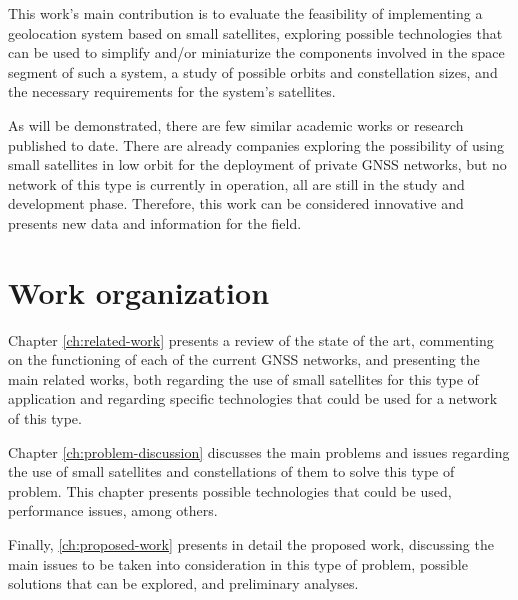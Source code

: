 This work's main contribution is to evaluate the feasibility of implementing a geolocation system based on small satellites, exploring possible technologies that can be used to simplify and/or miniaturize the components involved in the space segment of such a system, a study of possible orbits and constellation sizes, and the necessary requirements for the system's satellites.

As will be demonstrated, there are few similar academic works or research published to date. There are already companies exploring the possibility of using small satellites in low orbit for the deployment of private GNSS networks, but no network of this type is currently in operation, all are still in the study and development phase. Therefore, this work can be considered innovative and presents new data and information for the field.

\section{Work organization}




Chapter \ref{ch:related-work} presents a review of the state of the art, commenting on the functioning of each of the current GNSS networks, and presenting the main related works, both regarding the use of small satellites for this type of application and regarding specific technologies that could be used for a network of this type.

Chapter \ref{ch:problem-discussion} discusses the main problems and issues regarding the use of small satellites and constellations of them to solve this type of problem. This chapter presents possible technologies that could be used, performance issues, among others.

Finally, \autoref{ch:proposed-work} presents in detail the proposed work, discussing the main issues to be taken into consideration in this type of problem, possible solutions that can be explored, and preliminary analyses.

